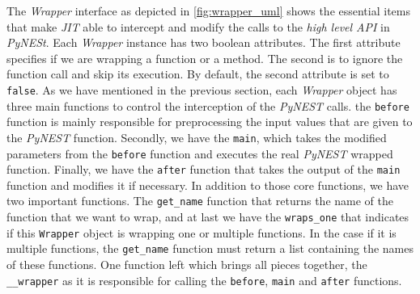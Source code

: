 The \emph{Wrapper} interface as depicted in \autoref{fig:wrapper_uml} shows the essential items that make \emph{JIT} able to intercept and modify the calls to the \emph{high level API} in \emph{PyNESt}. Each \emph{Wrapper} instance has two boolean attributes. The first attribute specifies if we are wrapping a function or a method. The second is to ignore the function call and skip its execution. By default, the second attribute is set to \texttt{false}. As we have mentioned in the previous section, each \emph{Wrapper} object has three main functions to control the interception of the \emph{PyNEST} calls. the \texttt{before} function is mainly responsible for preprocessing the input values that are given to the \emph{PyNEST} function. Secondly, we have the \texttt{main}, which takes the modified parameters from the \texttt{before} function and executes the real \emph{PyNEST} wrapped function. Finally, we have the \texttt{after} function that takes the output of the \texttt{main} function and modifies it if necessary. In addition to those core functions, we have two important functions. The \texttt{get\_name} function that returns the name of the function that we want to wrap, and at last we have the \texttt{wraps\_one} that indicates if this \texttt{Wrapper} object is wrapping one or multiple functions. In the case if it is multiple functions, the \texttt{get\_name} function must return a list containing the names of these functions. One function left which brings all pieces together, the \texttt{\_\_wrapper} as it is responsible for calling the \texttt{before}, \texttt{main} and \texttt{after} functions.


